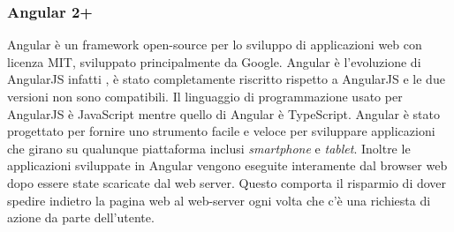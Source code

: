 \subsubsection*{Angular 2+}
Angular è un framework \gls{open-source}\ap{[g]} per lo sviluppo di applicazioni web con \gls{licenza MIT}\ap{[g]}, sviluppato principalmente da Google. Angular è l'evoluzione di AngularJS infatti , è stato completamente riscritto rispetto a AngularJS e le due versioni non sono compatibili. Il linguaggio di programmazione usato per AngularJS è JavaScript mentre quello di Angular è TypeScript. Angular è stato progettato per fornire uno strumento facile e veloce per sviluppare applicazioni che girano su qualunque piattaforma inclusi \emph{smartphone} e \emph{tablet}. Inoltre le applicazioni sviluppate in Angular vengono eseguite interamente dal \gls{browser web}\ap{[g]} dopo essere state scaricate dal web \gls{server}\ap{[g]}. Questo comporta il risparmio di dover spedire indietro la pagina web al web-server ogni volta che c'è una richiesta di azione da parte dell'utente. 

